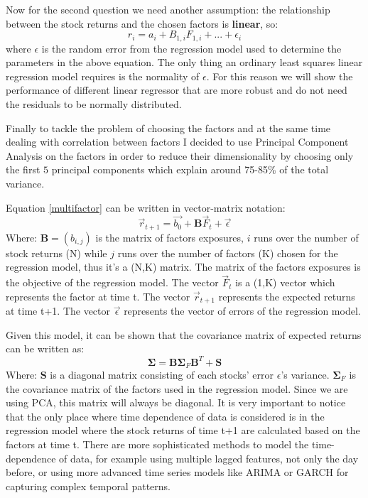 Now for the second question we need another assumption: the relationship between the stock returns and the chosen factors is \textbf{linear}, so:
\begin{equation}
    r_i = a_i + B_{1,i}F_{1,i} + ... + \epsilon_i
    \label{multifactor}
\end{equation}
where $\epsilon$ is the random error from the regression model used to determine the parameters in the above equation. The only thing an ordinary least squares linear regression model requires is the normality of $\epsilon$. For this reason we will show the performance of different linear regressor that are more robust and do not need the residuals to be normally distributed.


Finally to tackle the problem of choosing the factors and at the same time dealing with correlation between factors I decided to use Principal Component Analysis on the factors in order to reduce their dimensionality by choosing only the first $5$ principal components which explain around 75-85\% of the total variance.

Equation \eqref{multifactor} can be written in vector-matrix notation:
\begin{equation}
    \Vec{r}_{t+1} = \vec{b_0} + \mathbf{B}\vec{F}_{t} + \vec{\epsilon}
    \label{linear-multifactor-model}
\end{equation}
Where: $\mathbf{B} = (b_{i,j})$ is the matrix of factors exposures, $i$ runs over the number of stock returns (N) while $j$ runs over the number of factors (K) chosen for the regression model, thus it's a (N,K) matrix. The matrix of the factors exposures is the objective of the regression model. The vector $\vec{F}_{t}$ is a (1,K) vector which represents the factor at time t. The vector $\vec{r}_{t+1}$ represents the expected returns at time t+1. The vector $\vec{\epsilon}$ represents the vector of errors of the regression model.

Given this model, it can be shown that the covariance matrix of expected returns can be written as:
\begin{equation}
    \mathbf{\Sigma} = \mathbf{B}\mathbf{\Sigma}_{F}\mathbf{B}^{T} + \mathbf{S}
    \label{cov-matrix-returns}
\end{equation}
Where: $\mathbf{S}$ is a diagonal matrix consisting of each stocks' error $\epsilon$'s variance. $\mathbf{\Sigma}_{F}$ is the covariance matrix of the factors used in the regression model. Since we are using PCA, this matrix will always be diagonal.
It is very important to notice that the only place where time dependence of data is considered is in the regression model where the stock returns of time t+1 are calculated based on the factors at time t. There are more sophisticated methods to model the time-dependence of data, for example using multiple lagged features, not only the day before, or using more advanced time series models like ARIMA or GARCH for capturing complex temporal patterns.

